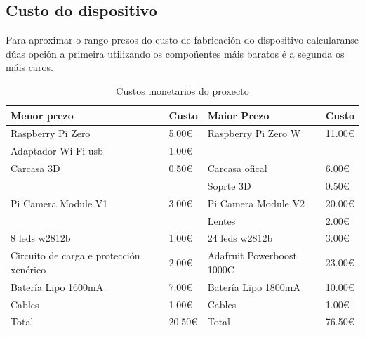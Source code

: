 \begin{itemize}
    \section{Custo do dispositivo}
    Para aproximar o rango prezos do custo de fabricación do dispositivo calcularanse dúas opción a primeira utilizando os compoñentes máis baratos é a segunda os máis caros.
    \begin{table}[tb]
        \label{c:custos dispositivo}
        \begin{center}
            \begin{tabular}{|l|l||l|l|}
                \hline
                 Menor prezo & Custo  & Maior Prezo & Custo \\ \hline
                 Raspberry Pi Zero & 5.00€  & Raspberry Pi Zero W& 11.00€ \\ \hline
                 Adaptador Wi-Fi usb & 1.00€ &  & \\ \hline
                 Carcasa 3D & 0.50€ & Carcasa ofical & 6.00€ \\ \hline
                  &  & Soprte 3D & 0.50€ \\ \hline
                 Pi Camera Module V1 & 3.00€ & Pi Camera Module V2 & 20.00€ \\ \hline
                  &  & Lentes  & 2.00€ \\ \hline
                 8 leds w2812b & 1.00€  &  24 leds w2812b & 3.00€\\ \hline
                 Circuito de carga e protección xenérico & 2.00€  & Adafruit Powerboost 1000C & 23.00€ \\ \hline
                 Batería Lipo 1600mA & 7.00€ & Batería Lipo 1800mA & 10.00€\\ \hline
                 Cables & 1.00€ &  Cables & 1.00€ \\ \hline
                 Total & 20.50€ &  Total & 76.50€ \\ \hline
            \end{tabular}
        \end{center}
        \caption{Custos monetarios do proxecto}
    \end{table}
\end{itemize}
